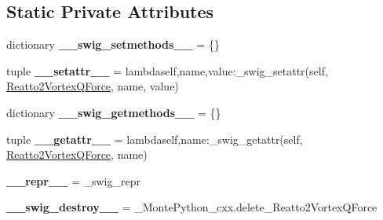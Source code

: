 \subsection*{Static Private Attributes}
\begin{DoxyCompactItemize}
\item 
\hypertarget{classMontePython__cxx_1_1Reatto2VortexQForce_af5f79548b77a707cdeff342a0f2b1f38}{}dictionary {\bfseries \+\_\+\+\_\+swig\+\_\+setmethods\+\_\+\+\_\+} = \{\}\label{classMontePython__cxx_1_1Reatto2VortexQForce_af5f79548b77a707cdeff342a0f2b1f38}

\item 
\hypertarget{classMontePython__cxx_1_1Reatto2VortexQForce_a7b1c7760f2bda254c89e9bcb6a6edd5e}{}tuple {\bfseries \+\_\+\+\_\+setattr\+\_\+\+\_\+} = lambdaself,name,value\+:\+\_\+swig\+\_\+setattr(self, \hyperlink{classMontePython__cxx_1_1Reatto2VortexQForce}{Reatto2\+Vortex\+Q\+Force}, name, value)\label{classMontePython__cxx_1_1Reatto2VortexQForce_a7b1c7760f2bda254c89e9bcb6a6edd5e}

\item 
\hypertarget{classMontePython__cxx_1_1Reatto2VortexQForce_af619e0bd0f112ecbd8a1109e0d8a3986}{}dictionary {\bfseries \+\_\+\+\_\+swig\+\_\+getmethods\+\_\+\+\_\+} = \{\}\label{classMontePython__cxx_1_1Reatto2VortexQForce_af619e0bd0f112ecbd8a1109e0d8a3986}

\item 
\hypertarget{classMontePython__cxx_1_1Reatto2VortexQForce_a412fd9a4e336fccd5a1f26362e52efee}{}tuple {\bfseries \+\_\+\+\_\+getattr\+\_\+\+\_\+} = lambdaself,name\+:\+\_\+swig\+\_\+getattr(self, \hyperlink{classMontePython__cxx_1_1Reatto2VortexQForce}{Reatto2\+Vortex\+Q\+Force}, name)\label{classMontePython__cxx_1_1Reatto2VortexQForce_a412fd9a4e336fccd5a1f26362e52efee}

\item 
\hypertarget{classMontePython__cxx_1_1Reatto2VortexQForce_a12173a7f90159f6800e7822a5c7bfe46}{}{\bfseries \+\_\+\+\_\+repr\+\_\+\+\_\+} = \+\_\+swig\+\_\+repr\label{classMontePython__cxx_1_1Reatto2VortexQForce_a12173a7f90159f6800e7822a5c7bfe46}

\item 
\hypertarget{classMontePython__cxx_1_1Reatto2VortexQForce_a9c6d3badf21c6ac30969052b76185e2d}{}{\bfseries \+\_\+\+\_\+swig\+\_\+destroy\+\_\+\+\_\+} = \+\_\+\+Monte\+Python\+\_\+cxx.\+delete\+\_\+\+Reatto2\+Vortex\+Q\+Force\label{classMontePython__cxx_1_1Reatto2VortexQForce_a9c6d3badf21c6ac30969052b76185e2d}

\end{DoxyCompactItemize}


